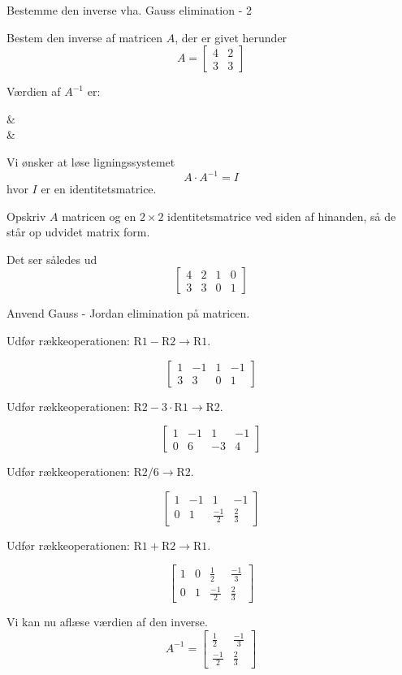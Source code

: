 \documentclass{article}
\begin{document}
\begin{exercise}{Bestemme den inverse vha. Gauss elimination - 2}

Bestem den inverse af matricen $A$, der er givet herunder
\[
A = \left[\begin{array}{cc}
4 & 2 \\
3 & 3
\end{array} \right]
\]

Værdien af $A^{-1}$ er:
\begin{answermatrix}
 &  \\
 & 
\end{answermatrix}

\hint
Vi ønsker at løse ligningssystemet
\[
A \cdot A^{-1} = I
\]
hvor $I$ er en identitetsmatrice.

\hint
Opskriv $A$ matricen og en $2 \times 2$ identitetsmatrice
ved siden af hinanden, så de står op udvidet matrix form.

\hint
Det ser således ud
\[
\left[\begin{array}{cc|cc}
4 & 2 & 1 & 0 \\
3 & 3 & 0 & 1
\end{array} \right]
\]

\hint
Anvend Gauss - Jordan elimination på matricen.

\hint
Udfør rækkeoperationen: $\text{R1} - \text{R2} \to \text{R1}$.

\hint
\[
\left[\begin{array}{cc|cc}
1 & -1 & 1 & -1 \\
3 & 3 & 0 & 1
\end{array} \right]
\]

\hint
Udfør rækkeoperationen: $\text{R2} - 3 \cdot \text{R1} \to \text{R2}$.

\hint
\[
\left[\begin{array}{cc|cc}
1 & -1 & 1 & -1 \\
0 & 6 & -3 & 4
\end{array} \right]
\]

\hint
Udfør rækkeoperationen: $\text{R2} / 6 \to \text{R2}$.

\hint
\[
\left[\begin{array}{cc|cc}
1 & -1 & 1 & -1 \\
0 & 1 & \frac{-1}{2} & \frac{2}{3}
\end{array} \right]
\]

\hint
Udfør rækkeoperationen: $\text{R1} + \text{R2} \to \text{R1}$.

\hint
\[
\left[\begin{array}{cc|cc}
1 & 0 & \frac{1}{2} & \frac{-1}{3} \\
0 & 1 & \frac{-1}{2} & \frac{2}{3}
\end{array} \right]
\]

\hint
Vi kan nu aflæse værdien af den inverse.
\[
A^{-1} = \left[\begin{array}{cc}
\frac{1}{2} & \frac{-1}{3} \\
\frac{-1}{2} & \frac{2}{3}
\end{array} \right]
\]


\end{exercise}
\end{document}
